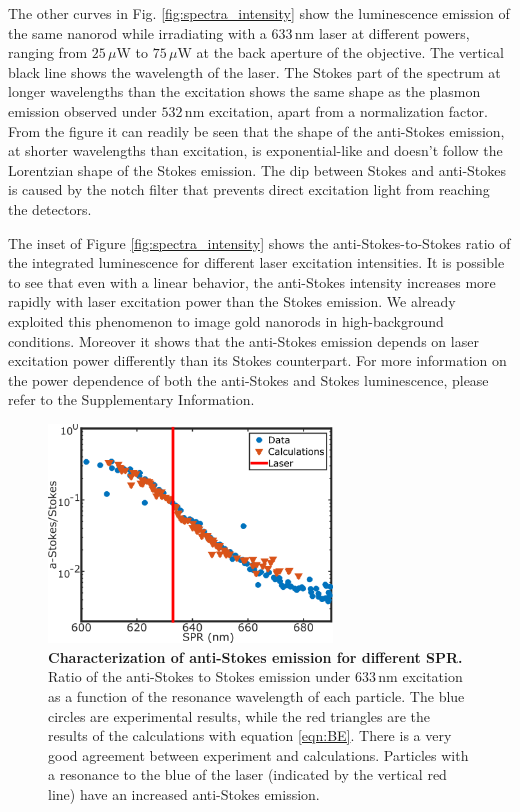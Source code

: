 \documentclass[journal=nalefd,manuscript=letter]{achemso}
\newcommand{\nm}{\ensuremath{\,\textrm{nm}}}
\newcommand{\uW}{\ensuremath{\,\mu\textrm{W}}}
\begin{document}
The other curves in Fig. \ref{fig:spectra_intensity} show the luminescence emission of
the same nanorod while irradiating with a $633\nm$ laser at different powers,
ranging from $25\uW$ to $75\uW$ at the back aperture of the objective.  
The vertical black line shows the wavelength of the laser. The Stokes part of the
spectrum at longer wavelengths than the excitation shows the same shape as the
plasmon emission observed under $532\nm$ excitation, apart from a normalization
factor. From the figure it can readily be seen that the shape of the anti-Stokes
emission, at shorter wavelengths than excitation, is exponential-like and
doesn't follow the Lorentzian shape of the Stokes emission. The dip between
Stokes and anti-Stokes is caused by the notch filter that prevents direct
excitation light from reaching the detectors. 

The inset of Figure \ref{fig:spectra_intensity} shows the anti-Stokes-to-Stokes ratio of
the integrated luminescence for different laser excitation intensities. It is
possible to see that even with a linear behavior, the anti-Stokes intensity
increases more rapidly with laser excitation power than the Stokes emission.
We already exploited this phenomenon to image gold nanorods in high-background
conditions\cite{Carattino2016a}. Moreover it shows that the anti-Stokes emission
depends on laser excitation power differently than its Stokes counterpart. For more 
information on the power dependence of both the anti-Stokes and Stokes luminescence, 
please refer to the Supplementary Information. 

\begin{figure}[tp] \centering
\includegraphics[width=75.5mm]{Figures/02_AS_vs_S_SPR/02_AS_vs_S_SPR.png}
\caption{\textbf{Characterization of anti-Stokes emission for different SPR.} 
Ratio of the anti-Stokes to Stokes emission under $633\nm$ excitation
as a function of the resonance wavelength of each particle.
The blue circles are experimental results, while the red triangles are the
results of the calculations with equation \ref{eqn:BE}. There is a very
good agreement between experiment and calculations. Particles with a resonance
to the blue of the laser (indicated by the vertical red line) have an increased anti-Stokes
emission.}
	\label{fig:ASS-ratio}
\end{figure}
\end{document}

